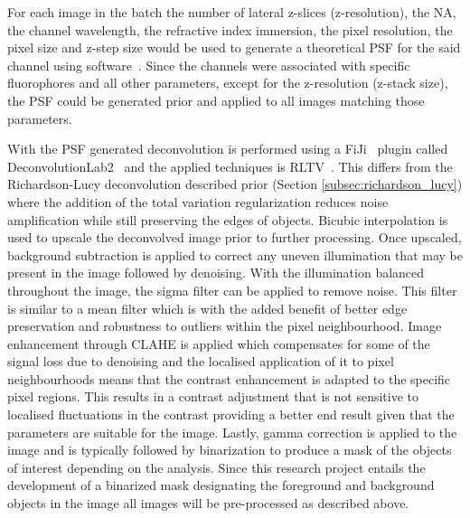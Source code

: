 For each image in the batch the number of lateral z-slices (z-resolution), the NA, the channel wavelength, the refractive index immersion, the pixel resolution, the pixel size and z-step size would be used to generate a theoretical PSF for the said channel using software~\cite{psfgen}. Since the channels were associated with specific fluorophores and all other parameters, except for the z-resolution (z-stack size), the PSF could be generated prior and applied to all images matching those parameters.\par With the PSF generated deconvolution is performed using a FiJi~\cite{Fiji_paper} plugin called DeconvolutionLab2~\cite{DeconLab2} and the applied techniques is RLTV~\cite{rltv}. This differs from the Richardson-Lucy deconvolution described prior (Section \ref{subsec:richardson_lucy}) where the addition of the total variation regularization reduces noise amplification while still preserving the edges of objects. Bicubic interpolation is used to upscale the deconvolved image prior to further processing. Once upscaled, background subtraction is applied to correct any uneven illumination that may be present in the image followed by denoising. With the illumination balanced throughout the image, the sigma filter can be applied to remove noise. This filter is similar to a mean filter which is with the added benefit of better edge preservation and robustness to outliers within the pixel neighbourhood. Image enhancement through CLAHE is applied which compensates for some of the signal loss due to denoising and the localised application of it to pixel neighbourhoods means that the contrast enhancement is adapted to the specific pixel regions. This results in a contrast adjustment that is not sensitive to localised fluctuations in the contrast providing a better end result given that the parameters are suitable for the image. Lastly, gamma correction is applied to the image and is typically followed by binarization to produce a mask of the objects of interest depending on the analysis. Since this research project entails the development of a binarized mask designating the foreground and background objects in the image all images will be pre-processed as described above.
